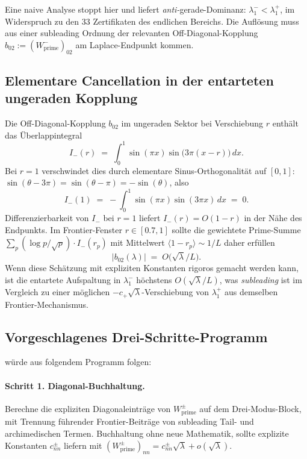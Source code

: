 \documentclass[11pt,a4paper]{article}
\theoremstyle{remark}
\theoremstyle{plain}
\begin{document}
Eine naive Analyse stoppt hier und liefert \emph{anti-}gerade-Dominanz: $\lambda_1^-<\lambda_1^+$, im Widerspruch zu den 33 Zertifikaten des endlichen Bereichs. Die Auflösung muss aus einer subleading Ordnung der relevanten Off-Diagonal-Kopplung $b_{02}:=(W^-_{\mathrm{prime}})_{02}$ am Laplace-Endpunkt kommen.

\subsection{Elementare Cancellation in der entarteten ungeraden Kopplung}

Die Off-Diagonal-Kopplung $b_{02}$ im ungeraden Sektor bei Verschiebung $r$ enthält das Überlappintegral
\[
  I_-(r) \;=\; \int_0^1 \sin(\pi x)\sin\bigl(3\pi(x-r)\bigr)\,dx.
\]
Bei $r=1$ verschwindet dies durch elementare Sinus-Orthogonalität auf $[0,1]$: $\sin(\theta-3\pi)=\sin(\theta-\pi)=-\sin(\theta)$, also
\[
  I_-(1) \;=\; -\int_0^1 \sin(\pi x)\sin(3\pi x)\,dx \;=\; 0.
\]
Differenzierbarkeit von $I_-$ bei $r=1$ liefert $I_-(r)=O(1-r)$ in der Nähe des Endpunkts. Im Frontier-Fenster $r\in[0.7,1]$ sollte die gewichtete Prime-Summe $\sum_p (\log p/\sqrt p)\cdot I_-(r_p)$ mit Mittelwert $\langle 1-r_p\rangle\sim 1/L$ daher erfüllen
\[
  \bigl|b_{02}(\lambda)\bigr| \;=\; O\bigl(\sqrt\lambda/L\bigr).
\]
Wenn diese Schätzung mit expliziten Konstanten rigoros gemacht werden kann, ist die entartete Aufspaltung in $\lambda_1^-$ höchstens $O(\sqrt\lambda/L)$, was \emph{subleading} ist im Vergleich zu einer möglichen $-c_+\sqrt\lambda$-Verschiebung von $\lambda_1^+$ aus demselben Frontier-Mechanismus.

\subsection{Vorgeschlagenes Drei-Schritte-Programm}

 würde aus folgendem Programm folgen:

\paragraph{Schritt 1. Diagonal-Buchhaltung.} Berechne die expliziten Diagonaleinträge von $W^\pm_{\mathrm{prime}}$ auf dem Drei-Modus-Block, mit Trennung führender Frontier-Beiträge von subleading Tail- und archimedischen Termen. Buchhaltung ohne neue Mathematik, sollte explizite Konstanten $c^\pm_{nn}$ liefern mit $(W^\pm_{\mathrm{prime}})_{nn}=c^\pm_{nn}\sqrt\lambda+o(\sqrt\lambda)$.
\end{document}
